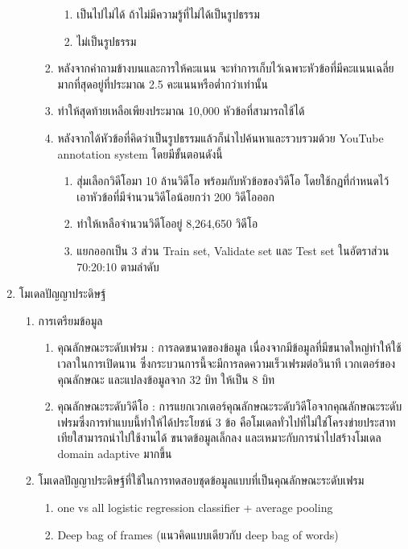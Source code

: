 \begin{enumerate}
\begin{enumerate}
\begin{enumerate}
\begin{enumerate}
				\item เป็นไปไม่ได้ ถ้าไม่มีความรู้ที่ไม่ได้เป็นรูปธรรม
				\item ไม่เป็นรูปธรรม
			\end{enumerate}
			\item หลังจากคำถามข้างบนและการให้คะแนน จะทำการเก็บไว้เฉพาะหัวข้อที่มีคะแนนเฉลี่ยมากที่สุดอยู่ที่ประมาณ 2.5 คะแนนหรือต่ำกว่าเท่านั้น
			\item ทำให้สุดท้ายเหลือเพียงประมาณ 10,000 หัวข้อที่สามารถใช้ได้
			\item หลังจากได้หัวข้อที่คิดว่าเป็นรูปธรรมแล้วก็นำไปค้นหาและรวบรวมด้วย YouTube annotation system โดยมีขั้นตอนดังนี้										
			\begin{enumerate}
				\setlength\itemsep{-0.25em}
				\item สุ่มเลือกวิดีโอมา 10 ล้านวิดีโอ พร้อมกับหัวข้อของวิดีโอ โดยใช้กฏที่กำหนดไว้ เอาหัวข้อที่มีจำนวนวิดีโอน้อยกว่า 200 วิดีโอออก
				\item ทำให้เหลือจำนวนวิดีโออยู่ 8,264,650 วิดีโอ
				\item แยกออกเป็น 3 ส่วน Train set, Validate set และ Test set ในอัตราส่วน 70:20:10 ตามลำดับ
			\end{enumerate}
		\end{enumerate}
	\end{enumerate}
	\item {โมเดลปัญญาประดิษฐ์}
	\begin{enumerate}
		\setlength\itemsep{-0.25em}
		\item การเตรียมข้อมูล
			\begin{enumerate}  
				\item คุณลักษณะระดับเฟรม : การลดขนาดของข้อมูล เนื่องจากมีข้อมูลที่มีขนาดใหญ่ทำให้ใช้เวลาในการเปิดนาน ซึ่งกระบวนการนี้จะมีการลดความเร็วเฟรมต่อวินาที 
				เวกเตอร์ของคุณลักษณะ และแปลงข้อมูลจาก 32 บิท ให้เป็น 8 บิท
				\item คุณลักษณะระดับวิดีโอ : การแยกเวกเตอร์คุณลักษณะระดับวิดีโอจากคุณลักษณะระดับเฟรมซึ่งการทำแบบนี้ทำให้ได้ประโยชน์ 3 ข้อ 
				คือโมเดลทั่วไปที่ไม่ใช่โครงข่ายประสาทเทียใสามารถนำไปใช้งานได้ ขนาดข้อมูลเล็กลง และเหมาะกับการนำไปสร้างโมเดล domain adaptive มากขึ้น
			\end{enumerate}	
		\item โมเดลปัญญาประดิษฐ์ที่ใช้ในการทดสอบชุดข้อมูลแบบที่เป็นคุณลักษณะระดับเฟรม
			\begin{enumerate}
				\setlength\itemsep{-0.25em}
				\item one vs all logistic regression classifier + average pooling
				\item Deep bag of frames (แนวคิดแบบเดียวกับ deep bag of words)

\end{enumerate}
\end{enumerate}
\end{enumerate}
